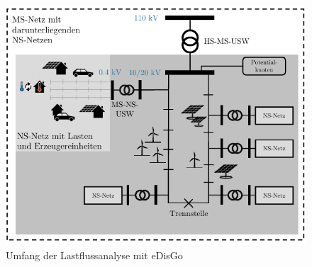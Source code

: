 \begin{figure}[H]
    \centering
    \includegraphics[width=\textwidth]{Bilder/scope_power_flow_kh_cropped}
    \caption[Umfang der Lastflussanalyse mit eDisGo]{Umfang der Lastflussanalyse mit eDisGo \cite{Schachler}}\label{fig:scope}
\end{figure}